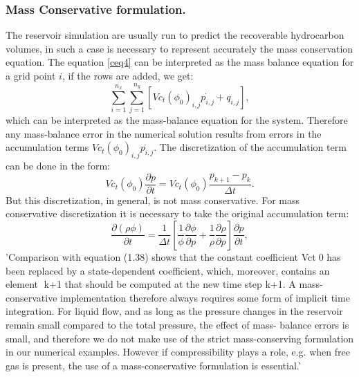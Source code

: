 \documentclass[12pt]{report}
\begin{document}
\subsubsection{Mass Conservative formulation.}
The reservoir simulation are usually run to predict the recoverable hydrocarbon volumes, 
in such a case is necessary to represent accurately the mass conservation equation.
The equation \eqref{ceq4} can be interpreted as the mass balance equation for a grid point $i$,
if the rows are added, we get:
\begin{equation}
 \sum_{i=1}^{n_x} \sum_{j=1}^{n_y}[Vc_t(\phi_0)_{i,j}\dot{p_{i,j}}+q_{i,j}],
\end{equation}
which can be interpreted as the mass-balance equation for the system. Therefore any mass-balance
error in the numerical solution results from errors in the accumulation terms 
$Vc_t(\phi_0)_{i,j}\dot{p_{i,j}}.$
The discretization of the accumulation term can be done in the form:
\begin{equation}
 Vc_t(\phi_0)\frac{\partial p}{\partial t}=Vc_t(\phi_0)\frac{p_{k+1}-p_{k}}{\Delta t}.
\end{equation}
But this discretization, in general, is not mass conservative. For mass conservative discretization
it is necessary to take the original accumulation term:
\begin{equation*}
 \frac{\partial(\rho \phi)}{\partial t}=\frac{1}{\Delta t}\left[
 \frac{1}{\phi}\frac{\partial \phi}{\partial p}+\frac{1}{\rho}\frac{\partial\rho }{\partial p}
\right]\frac{\partial p}{\partial t},
 \end{equation*}
'Comparison with equation (1.38) shows that the constant coefficient Vct0 has been replaced
by a state-dependent coefficient, which, moreover, contains an element k+1 that should be
computed at the new time step k+1. A mass-conservative implementation therefore always
requires some form of implicit time integration. For liquid flow, and as long as the pressure
changes in the reservoir remain small compared to the total pressure, the effect of mass-
balance errors is small, and therefore we do not make use of the strict mass-conserving
formulation in our numerical examples. However if compressibility plays a role, e.g. when
free gas is present, the use of a mass-conservative formulation is essential.'
\end{document}
